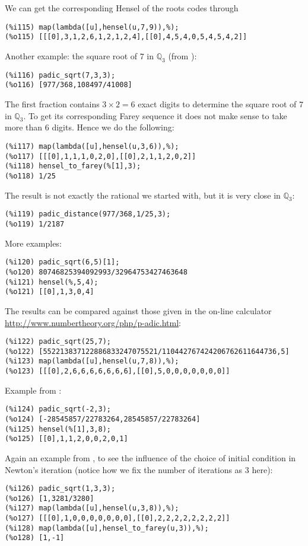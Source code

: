\documentclass[fleqn]{cas-sc}
\begin{document}
We can get the corresponding Hensel of the roots codes through
\begin{verbatim}
(%i115)	map(lambda([u],hensel(u,7,9)),%);
(%o115)	[[[0],3,1,2,6,1,2,1,2,4],[[0],4,5,4,0,5,4,5,4,2]]
\end{verbatim}

Another example: the square root of $7$ in $\mathbb{Q}_3$ (from \cite{9}):
\begin{verbatim}
(%i116)	padic_sqrt(7,3,3);
(%o116)	[977/368,108497/41008]
\end{verbatim}

The first fraction contains $3\times 2=6$ exact digits to determine the square
root of $7$ in $\mathbb{Q}_3$. To get its corresponding Farey sequence it does not
make sense to take more than $6$ digits. Hence we do the following:

\begin{verbatim}
(%i117)	map(lambda([u],hensel(u,3,6)),%);
(%o117)	[[[0],1,1,1,0,2,0],[[0],2,1,1,2,0,2]]
(%i118)	hensel_to_farey(%[1],3);
(%o118)	1/25
\end{verbatim}

The result is not exactly the rational we started with, but it is very close
in $\mathbb{Q}_3$:
\begin{verbatim}
(%i119)	padic_distance(977/368,1/25,3);
(%o119)	1/2187
\end{verbatim}

More examples:
\begin{verbatim}
(%i120)	padic_sqrt(6,5)[1];
(%o120)	80746825394092993/32964753427463648
(%i121)	hensel(%,5,4);
(%o121)	[[0],1,3,0,4]
\end{verbatim}

The results can be compared against those given in
the on-line calculator \url{http://www.numbertheory.org/php/p-adic.html}:
\begin{verbatim}
(%i122)	padic_sqrt(25,7);
(%o122)	[552213837122886833247075521/110442767424206762611644736,5]
(%i123)	map(lambda([u],hensel(u,7,8)),%);
(%o123)	[[[0],2,6,6,6,6,6,6,6],[[0],5,0,0,0,0,0,0,0]]
\end{verbatim}

Example from \cite{10}:
\begin{verbatim}
(%i124)	padic_sqrt(-2,3);
(%o124)	[-28545857/22783264,28545857/22783264]
(%i125)	hensel(%[1],3,8);
(%o125)	[[0],1,1,2,0,0,2,0,1]
\end{verbatim}

Again an example from \cite{9}, to see the influence of the choice of initial condition
in Newton's iteration (notice how we fix the number of iterations as $3$ here):
\begin{verbatim}
(%i126)	padic_sqrt(1,3,3);
(%o126)	[1,3281/3280]
(%i127)	map(lambda([u],hensel(u,3,8)),%);
(%o127)	[[[0],1,0,0,0,0,0,0,0],[[0],2,2,2,2,2,2,2,2]]
(%i128)	map(lambda([u],hensel_to_farey(u,3)),%);
(%o128)	[1,-1]
\end{verbatim}
\end{document}
